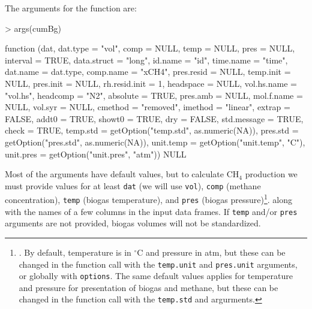 \documentclass{article}
\begin{document}
\newline
The arguments for the function are:

\begin{Schunk}
\begin{Sinput}
>   args(cumBg)
\end{Sinput}
\begin{Soutput}
function (dat, dat.type = "vol", comp = NULL, temp = NULL, pres = NULL, 
    interval = TRUE, data.struct = "long", id.name = "id", time.name = "time", 
    dat.name = dat.type, comp.name = "xCH4", pres.resid = NULL, 
    temp.init = NULL, pres.init = NULL, rh.resid.init = 1, headspace = NULL, 
    vol.hs.name = "vol.hs", headcomp = "N2", absolute = TRUE, 
    pres.amb = NULL, mol.f.name = NULL, vol.syr = NULL, cmethod = "removed", 
    imethod = "linear", extrap = FALSE, addt0 = TRUE, showt0 = TRUE, 
    dry = FALSE, std.message = TRUE, check = TRUE, temp.std = getOption("temp.std", 
        as.numeric(NA)), pres.std = getOption("pres.std", as.numeric(NA)), 
    unit.temp = getOption("unit.temp", "C"), unit.pres = getOption("unit.pres", 
        "atm")) 
NULL
\end{Soutput}
\end{Schunk}

Most of the arguments have default values, but to calculate CH$_4$ production we must provide values for at least  \texttt{dat} (we will use \texttt{vol}), \texttt{comp} (methane concentration), \texttt{temp} (biogas temperature), and \texttt{pres} (biogas pressure)\footnote{.      
  By default, temperature is in $^\circ$C and pressure in atm, but these can be changed in the function call with the \texttt{temp.unit} and \texttt{pres.unit} arguments, or globally with \texttt{options}. The same default values applies for temperature and pressure for presentation of biogas and methane, but these can be changed in the function call with the \texttt{temp.std} and  argurments.}. along with the names of a few columns in the input data frames. If \texttt{temp} and/or \texttt{pres} arguments are not provided, biogas volumes will not be standardized.
\end{document}
